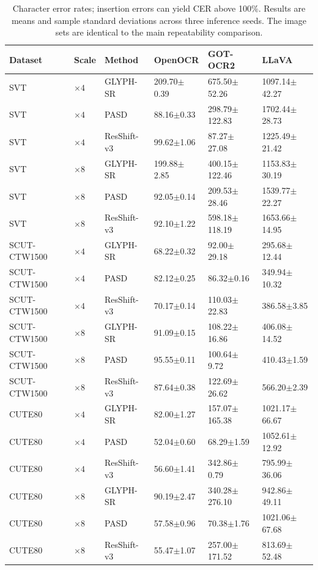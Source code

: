 \begin{table}[H]
\centering
\caption{Character error rates; insertion errors can yield CER above 100\%. Results are means and sample standard deviations across three inference seeds. The image sets are identical to the main repeatability comparison.}
\label{tab:ar-main-cer}
\small
\setlength{\tabcolsep}{4pt}
\begin{tabular}{llllll}
\toprule
Dataset & Scale & Method & OpenOCR & GOT-OCR2 & LLaVA \\
\midrule
SVT & $\times4$ & GLYPH-SR & 209.70$\pm$0.39 & 675.50$\pm$52.26 & 1097.14$\pm$42.27 \\
SVT & $\times4$ & PASD & 88.16$\pm$0.33 & 298.79$\pm$122.83 & 1702.44$\pm$28.73 \\
SVT & $\times4$ & ResShift-v3 & 99.62$\pm$1.06 & 87.27$\pm$27.08 & 1225.49$\pm$21.42 \\
SVT & $\times8$ & GLYPH-SR & 199.88$\pm$2.85 & 400.15$\pm$122.46 & 1153.83$\pm$30.19 \\
SVT & $\times8$ & PASD & 92.05$\pm$0.14 & 209.53$\pm$28.46 & 1539.77$\pm$22.27 \\
SVT & $\times8$ & ResShift-v3 & 92.10$\pm$1.22 & 598.18$\pm$118.19 & 1653.66$\pm$14.95 \\
SCUT-CTW1500 & $\times4$ & GLYPH-SR & 68.22$\pm$0.32 & 92.00$\pm$29.18 & 295.68$\pm$12.44 \\
SCUT-CTW1500 & $\times4$ & PASD & 82.12$\pm$0.25 & 86.32$\pm$0.16 & 349.94$\pm$10.32 \\
SCUT-CTW1500 & $\times4$ & ResShift-v3 & 70.17$\pm$0.14 & 110.03$\pm$22.83 & 386.58$\pm$3.85 \\
SCUT-CTW1500 & $\times8$ & GLYPH-SR & 91.09$\pm$0.15 & 108.22$\pm$16.86 & 406.08$\pm$14.52 \\
SCUT-CTW1500 & $\times8$ & PASD & 95.55$\pm$0.11 & 100.64$\pm$9.72 & 410.43$\pm$1.59 \\
SCUT-CTW1500 & $\times8$ & ResShift-v3 & 87.64$\pm$0.38 & 122.69$\pm$26.62 & 566.20$\pm$2.39 \\
CUTE80 & $\times4$ & GLYPH-SR & 82.00$\pm$1.27 & 157.07$\pm$165.38 & 1021.17$\pm$66.67 \\
CUTE80 & $\times4$ & PASD & 52.04$\pm$0.60 & 68.29$\pm$1.59 & 1052.61$\pm$12.92 \\
CUTE80 & $\times4$ & ResShift-v3 & 56.60$\pm$1.41 & 342.86$\pm$0.79 & 795.99$\pm$36.06 \\
CUTE80 & $\times8$ & GLYPH-SR & 90.19$\pm$2.47 & 340.28$\pm$276.10 & 942.86$\pm$49.11 \\
CUTE80 & $\times8$ & PASD & 57.58$\pm$0.96 & 70.38$\pm$1.76 & 1021.06$\pm$67.68 \\
CUTE80 & $\times8$ & ResShift-v3 & 55.47$\pm$1.07 & 257.00$\pm$171.52 & 813.69$\pm$52.48 \\
\bottomrule
\end{tabular}
\end{table}

